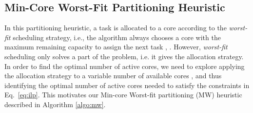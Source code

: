 \documentclass[conference]{IEEEtran}
\begin{document}
\vspace{-0.1in}

\subsection{Min-Core Worst-Fit Partitioning Heuristic}

In this partitioning heuristic, a task is allocated to a core according to  the 
\emph{worst-fit} scheduling strategy, i.e., 
the algorithm always chooses a core with the maximum remaining capacity to assign the next task \cite{Langen09}, \cite{Aydin03}.
However,  \emph{worst-fit} scheduling only solves a part of the problem, i.e. it gives the allocation strategy.
In order to find the optimal number of active cores, 
we need to explore applying the allocation strategy to a variable number of available cores \cite{Langen09},
and thus identifying the optimal number of active cores needed to 
satisfy  the constraints in Eq.~\ref{eq:ilp}.
This motivates our Min-core Worst-fit partitioning (MW) heuristic described in Algorithm \ref{algo:mw}.
\end{document}
